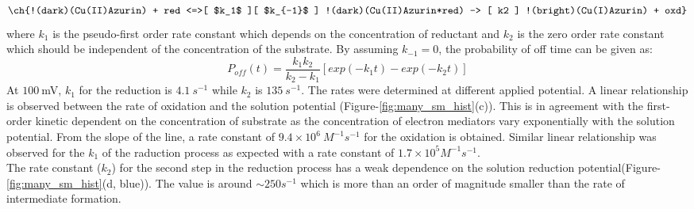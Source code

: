 \documentclass[journal=jacsat,manuscript=article]{achemso}
\begin{document}
\begin{align}
	\ch{!(dark)(Cu(II)Azurin) + red <=>[ $k_1$ ][ $k_{-1}$ ] !(dark)(Cu(II)Azurin*red) -> [ k2 ] !(bright)(Cu(I)Azurin) + oxd}
	\label{eq:reduction}
\end{align}
where $k_1$ is the pseudo-first order rate constant which depends on the concentration of reductant and $k_2$ is the zero order rate constant which should be independent of the concentration of the substrate. By assuming $k_{-1}=0$, the probability of off time can be given as:\cite{lu1998single-molecule}
\begin{equation}
	P_{off}(t) = \frac{k_1k_2}{k_2-k_1} [exp(-k_1t)-exp(-k_2t)]
	\label{eq:2exp_risetime}
\end{equation}
At $100~$mV, $k_1$ for the reduction is $4.1~s^{-1}$ while $k_2$ is $135~s^{-1}$. The rates were determined at different applied potential. A linear relationship is observed between the rate of oxidation and the solution potential (Figure-\ref{fig:many_sm_hist}(c)). This is in agreement with the first-order kinetic dependent on the concentration of substrate as the concentration of electron mediators vary exponentially with the solution potential. From the slope of the line, a rate constant of $9.4\times10^6~M^{-1}s^{-1}$ for the oxidation is obtained. Similar linear relationship was observed for the $k_1$ of the raduction process as expected with a rate constant of $1.7\times10^5M^{-1}s^{-1}$.\\
The rate constant ($k_2$) for the second step in the reduction process has a weak dependence on the solution reduction potential(Figure-\ref{fig:many_sm_hist}(d, blue)). The value is around ${\sim}250s^{-1}$ which is more than an order of magnitude smaller than the rate of intermediate formation.\\
\end{document}

